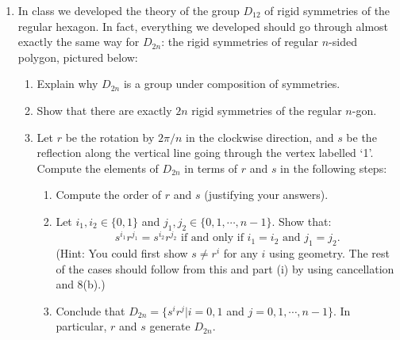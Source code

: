\documentclass[11pt]{article}
\begin{document}
\begin{enumerate}
	\item{In class we developed the theory of the group $D_{12}$ of rigid symmetries of the regular hexagon.  In fact, everything we developed should go through almost exactly the same way for $D_{2n}$: the rigid symmetries of regular $n$-sided polygon, pictured below:
	\begin{center}
   \end{center}
   }
   \begin{enumerate}
     \item{
     Explain why $D_{2n}$ is a group under composition of symmetries.
     }
     \item{
     Show that there are exactly $2n$ rigid symmetries of the regular $n$-gon.
     }
     \item{
     Let $r$ be the rotation by $2\pi/n$ in the clockwise direction, and $s$ be the reflection along the vertical line going through the vertex labelled `1'.  Compute the elements of $D_{2n}$ in terms of $r$ and $s$ in the following steps:
     \begin{enumerate}
       \item{
       Compute the order of $r$ and $s$ (justifying your answers).
       }
       \item{
       Let $i_1,i_2\in\{0,1\}$ and $j_1,j_2\in\{0,1,\cdots,n-1\}$.  Show that:
       \[s^{i_1}r^{j_1}=s^{i_2}r^{j_2}\text{ if and only if }i_1=i_2\text{ and }j_1=j_2.\]
       }
       (Hint: You could first show $s\not=r^i$ for any $i$ using geometry.  The rest of the cases should follow from this and part (i) by using cancellation and 8(b).)
       \item{
       Conclude that $D_{2n} = \{s^ir^j|i=0,1$ and $j=0,1,\cdots,n-1\}$.  In particular, $r$ and $s$ generate $D_{2n}$.
       }
     \end{enumerate}
}
\end{enumerate}
\end{enumerate}
\end{document}
